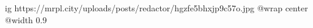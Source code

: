  
 
 
 
 

\ifcmt
  ig https://mrpl.city/uploads/posts/redactor/hgzfe5bhxjp9c57o.jpg
  @wrap center
  @width 0.9
\fi
